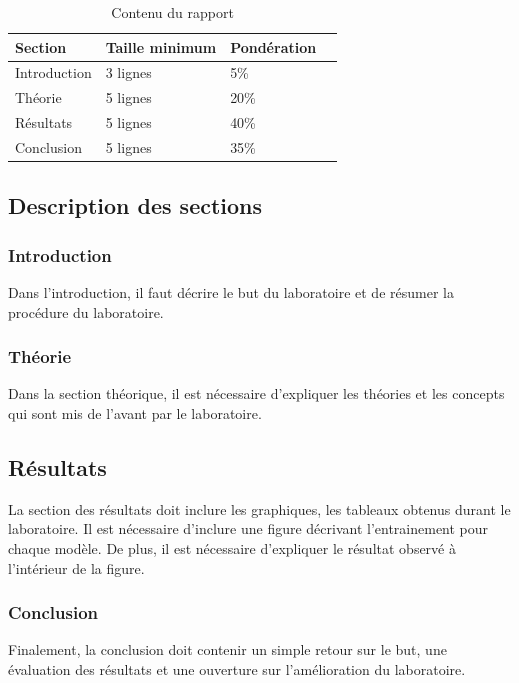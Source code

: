 \documentclass{article}
\begin{document}
\begin{table}[H]
  \caption{Contenu du rapport}
  \label{tab:remettre}
  \centering
  \begin{tabular}{|l|l|l|c|}
    \hline
    Section & Taille minimum & Pondération \\
    \hline
    Introduction & 3 lignes & 5\%\\
    Théorie & 5 lignes & 20\%\\
    Résultats & 5 lignes & 40\%\\
    Conclusion & 5 lignes & 35\%\\
    \hline
  \end{tabular}
\end{table}

\subsection{Description des sections}
\subsubsection{Introduction}
Dans l'introduction, il faut décrire le but du laboratoire et de résumer la procédure du laboratoire.

\subsubsection{Théorie}
Dans la section théorique, il est nécessaire d'expliquer les théories et les concepts qui sont mis de l'avant par le laboratoire.

\subsection{Résultats}
La section des résultats doit inclure les graphiques, les tableaux obtenus durant le laboratoire. Il est nécessaire d'inclure une figure décrivant l'entrainement pour chaque modèle. De plus, il est nécessaire d'expliquer le résultat observé à l'intérieur de la figure.

\subsubsection{Conclusion}
Finalement, la conclusion doit contenir un simple retour sur le but, une évaluation des résultats et une ouverture sur l'amélioration du laboratoire.

%
%
%



\end{document}
